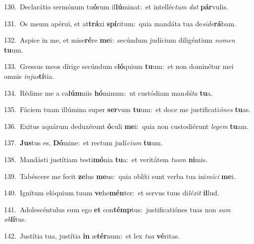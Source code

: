{\numbfont\textcolor{\numbcolor}{130.}}~Declarátio sermónum tu\-\textbf{ó}\-rum il\-\textbf{lú}\-minat:~\star et intelléc\textit{tum} \textit{dat} \textbf{pár}\-vulis.\par
{\numbfont\textcolor{\numbcolor}{131.}}~Os meum apérui, et at\-\textbf{trá}\-xi \textbf{spí}\-ritum:~\star quia mandáta tua de\-\textit{si}\-\textit{de}\textbf{rá}bam.\par
{\numbfont\textcolor{\numbcolor}{132.}}~Aspice in me, et mise\-\textbf{ré}\-re \textbf{me}\-i:~\star secúndum judícium diligéntium \textit{no}\-\textit{men} \textbf{tu}\-um.\par
{\numbfont\textcolor{\numbcolor}{133.}}~Gressus meos dírige secúndum e\-\textbf{ló}\-quium \textbf{tu}\-um:~\star et non dominétur mei omnis \textit{in}\-\textit{jus}\textbf{tí}tia.\par
{\numbfont\textcolor{\numbcolor}{134.}}~Rédime me a ca\-\textbf{lúm}\-niis \textbf{hó}\-minum:~\star ut custódiam man\-\textit{dá}\-\textit{ta} \textbf{tu}\-a.\par
{\numbfont\textcolor{\numbcolor}{135.}}~Fáciem tuam illúmina super \textbf{ser}\-vum \textbf{tu}\-um:~\star et doce me justificati\-\textit{ó}\-\textit{nes} \textbf{tu}\-as.\par
{\numbfont\textcolor{\numbcolor}{136.}}~Exitus aquárum deduxérunt \textbf{ó}\-culi \textbf{me}\-i:~\star quia non custodiérunt \textit{le}\-\textit{gem} \textbf{tu}\-am.\par
{\numbfont\textcolor{\numbcolor}{137.}}~\-\textbf{Jus}\-tus es, \textbf{Dó}\-mine:~\star et rectum judí\-\textit{ci}\-\textit{um} \textbf{tu}\-um.\par
{\numbfont\textcolor{\numbcolor}{138.}}~Mandásti justítiam testi\-\textbf{mó}\-nia \textbf{tu}\-a:~\star et veritátem \textit{tu}\-\textit{am} \textbf{ni}\-mis.\par
{\numbfont\textcolor{\numbcolor}{139.}}~Tabéscere me fecit \textbf{ze}\-lus \textbf{me}\-us:~\star quia oblíti sunt verba tua ini\-\textit{mí}\-\textit{ci} \textbf{me}\-i.\par
{\numbfont\textcolor{\numbcolor}{140.}}~Ignítum elóquium tuum \textbf{ve}\-he\-\textbf{mén}\-ter:~\star et servus tuus di\-\textit{lé}\-\textit{xit} \textbf{il}\-lud.\par
{\numbfont\textcolor{\numbcolor}{141.}}~Adolescéntulus sum ego \textbf{et} con\-\textbf{témp}\-tus:~\star justificatiónes tuas non \textit{sum} \textit{ob}\-\textbf{lí}tus.\par
{\numbfont\textcolor{\numbcolor}{142.}}~Justítia tua, justítia \textbf{in} æ\-\textbf{tér}\-num:~\star et lex \textit{tu}\-\textit{a} \textbf{vé}\-ritas.\par

